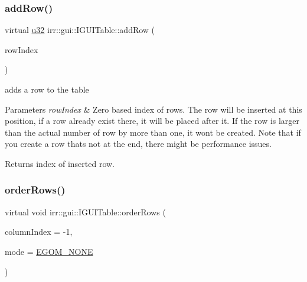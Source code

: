 \subsubsection{\texorpdfstring{add\+Row()}{addRow()}}
{\footnotesize\ttfamily virtual \hyperlink{namespaceirr_a0416a53257075833e7002efd0a18e804}{u32} irr\+::gui\+::\+I\+G\+U\+I\+Table\+::add\+Row (\begin{DoxyParamCaption}\item[{\hyperlink{namespaceirr_a0416a53257075833e7002efd0a18e804}{u32}}]{row\+Index }\end{DoxyParamCaption})\hspace{0.3cm}{\ttfamily [pure virtual]}}



adds a row to the table 


\begin{DoxyParams}{Parameters}
{\em row\+Index} & Zero based index of rows. The row will be inserted at this position, if a row already exist there, it will be placed after it. If the row is larger than the actual number of row by more than one, it won\textquotesingle{}t be created. Note that if you create a row that\textquotesingle{}s not at the end, there might be performance issues. \\
\hline
\end{DoxyParams}
\begin{DoxyReturn}{Returns}
index of inserted row. 
\end{DoxyReturn}
\mbox{\label{classirr_1_1gui_1_1IGUITable_a22ec8c1ee8e6a191b8bdcd741b0144f2}} 
\subsubsection{\texorpdfstring{order\+Rows()}{orderRows()}}
{\footnotesize\ttfamily virtual void irr\+::gui\+::\+I\+G\+U\+I\+Table\+::order\+Rows (\begin{DoxyParamCaption}\item[{\hyperlink{namespaceirr_ac66849b7a6ed16e30ebede579f9b47c6}{s32}}]{column\+Index = {\ttfamily -\/1},  }\item[{\hyperlink{namespaceirr_1_1gui_a577bf3aa30c2e3bde9aa3eaa2e4f16d3}{E\+G\+U\+I\+\_\+\+O\+R\+D\+E\+R\+I\+N\+G\+\_\+\+M\+O\+DE}}]{mode = {\ttfamily \hyperlink{namespaceirr_1_1gui_a577bf3aa30c2e3bde9aa3eaa2e4f16d3a4663b40ac164a811834112141af86961}{E\+G\+O\+M\+\_\+\+N\+O\+NE}} }\end{DoxyParamCaption})\hspace{0.3cm}{\ttfamily [pure virtual]}}



